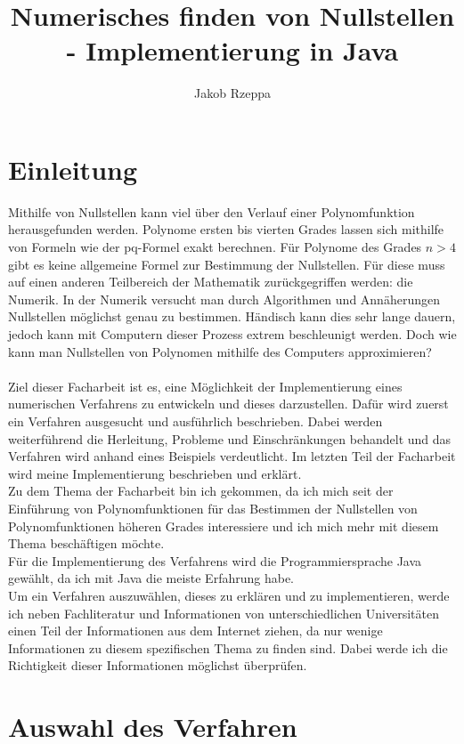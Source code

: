 \documentclass[12pt]{article}
\title{Numerisches finden von Nullstellen - Implementierung in Java}
\author{Jakob Rzeppa}
\begin{document}
\tableofcontents

\section{Einleitung}
Mithilfe von Nullstellen kann viel über den Verlauf einer Polynomfunktion herausgefunden werden. Polynome ersten bis vierten Grades lassen sich mithilfe von Formeln wie der pq-Formel exakt berechnen. 
Für Polynome des Grades $n > 4$ gibt es keine allgemeine Formel zur Bestimmung der Nullstellen. Für diese muss auf einen anderen Teilbereich der Mathematik zurückgegriffen werden: die Numerik. 
In der Numerik versucht man durch Algorithmen und Annäherungen Nullstellen möglichst genau zu bestimmen. Händisch kann dies sehr lange dauern, jedoch kann mit Computern dieser Prozess extrem beschleunigt werden.
Doch wie kann man Nullstellen von Polynomen mithilfe des Computers approximieren?\\
\\
Ziel dieser Facharbeit ist es, eine Möglichkeit der Implementierung eines numerischen Verfahrens zu entwickeln und dieses darzustellen. Dafür wird zuerst ein Verfahren ausgesucht und ausführlich beschrieben. 
Dabei werden weiterführend die Herleitung, Probleme und Einschränkungen behandelt und das Verfahren wird anhand eines Beispiels verdeutlicht. 
Im letzten Teil der Facharbeit wird meine Implementierung beschrieben und erklärt.\\
Zu dem Thema der Facharbeit bin ich gekommen, da ich mich seit der Einführung von Polynomfunktionen für das Bestimmen der Nullstellen von Polynomfunktionen höheren Grades interessiere und ich mich mehr mit diesem Thema beschäftigen möchte.
\\
Für die Implementierung des Verfahrens wird die Programmiersprache Java gewählt, da ich mit Java die meiste Erfahrung habe.\\
Um ein Verfahren auszuwählen, dieses zu erklären und zu implementieren, werde ich neben Fachliteratur und Informationen von unterschiedlichen Universitäten einen Teil der Informationen aus dem Internet ziehen, da nur wenige Informationen zu diesem spezifischen Thema zu finden sind. Dabei werde ich die Richtigkeit dieser Informationen möglichst überprüfen. %

\section{Auswahl des Verfahren}
\end{document}

